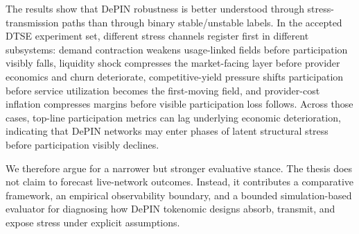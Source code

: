 \documentclass[12pt,a4paper]{article}
\begin{document}
The results show that DePIN robustness is better understood through stress-transmission paths than through binary stable/unstable labels. In the accepted DTSE experiment set, different stress channels register first in different subsystems: demand contraction weakens usage-linked fields before participation visibly falls, liquidity shock compresses the market-facing layer before provider economics and churn deteriorate, competitive-yield pressure shifts participation before service utilization becomes the first-moving field, and provider-cost inflation compresses margins before visible participation loss follows. Across those cases, top-line participation metrics can lag underlying economic deterioration, indicating that DePIN networks may enter phases of latent structural stress before participation visibly declines.

We therefore argue for a narrower but stronger evaluative stance. The thesis does not claim to forecast live-network outcomes. Instead, it contributes a comparative framework, an empirical observability boundary, and a bounded simulation-based evaluator for diagnosing how DePIN tokenomic designs absorb, transmit, and expose stress under explicit assumptions.
\clearpage

\tableofcontents
\clearpage

{}
\listoffigures

{}
\listoftables
\clearpage

\hypersetup{pageanchor=true}


\clearpage
\appendix
\renewcommand{\thetable}{A.\arabic{table}}
\setcounter{table}{0}

\clearpage
\printbibliography
\end{document}
